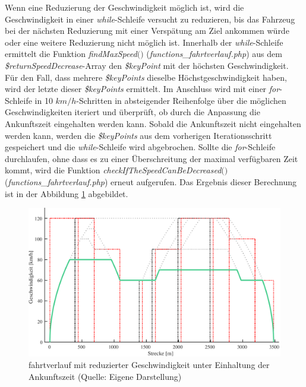 Wenn eine Reduzierung der Geschwindigkeit möglich ist, wird die Geschwindigkeit in einer \textit{while}-Schleife versucht zu reduzieren, bis das Fahrzeug bei der nächsten Reduzierung mit einer Verspätung am Ziel ankommen würde oder eine weitere Reduzierung nicht möglich ist. Innerhalb der \textit{while}-Schleife ermittelt die Funktion \textit{find\-Max\-Speed$($$)$} (\textit{functions\_fahrtverlauf.php}) aus dem \textit{\$returnSpeedDecrease}-Array den \textit{\$keyPoint} mit der höchsten Geschwindigkeit. Für den Fall, dass mehrere \textit{\$keyPoints} dieselbe Höchstgeschwindigkeit haben, wird der letzte dieser \textit{\$keyPoints} ermittelt. Im Anschluss wird mit einer \textit{for}-Schleife in 10 $km/h$-Schritten in absteigender Reihenfolge über die möglichen Geschwindigkeiten iteriert und überprüft, ob durch die Anpassung die Ankunftszeit eingehalten werden kann. Sobald die Ankunftszeit nicht eingehalten werden kann, werden die \textit{\$keyPoints} aus dem vorherigen Iterationsschritt gespeichert und die \textit{while}-Schleife wird abgebrochen. Sollte die \textit{for}-Schleife durchlaufen, ohne dass es zu einer Überschreitung der maximal verfügbaren Zeit kommt, wird die Funktion \textit{checkIfTheSpeedCanBeDecreased$($$)$} (\textit{functions\_fahrtverlauf.php}) erneut aufgerufen. 
Das Ergebnis dieser Berechnung ist in der Abbildung \ref{fig:it10} abgebildet.
\begin{figure}
\includegraphics[width=\linewidth]{../images/matlab/it10.pdf}
\caption[\Gls{fahrtverlauf} mit reduzierter Geschwindigkeit unter Einhaltung der An\-kunfts\-zeit]{\Gls{fahrtverlauf} mit reduzierter Geschwindigkeit unter Einhaltung der An\-kunfts\-zeit (Quelle: Eigene Darstellung)}
\label{fig:it10}
\end{figure}
